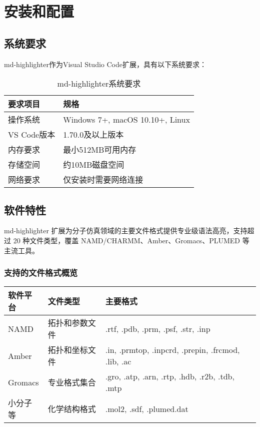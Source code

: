 
\section{安装和配置}

\subsection{系统要求}

md-highlighter作为Visual Studio Code扩展，具有以下系统要求：

\begin{table}[h]
\centering
\caption{md-highlighter系统要求}
\begin{tabular}{p{3cm}p{8cm}}
\toprule
\textbf{要求项目} & \textbf{规格} \\
\midrule
操作系统 & Windows 7+, macOS 10.10+, Linux \\
VS Code版本 & 1.70.0及以上版本 \\
内存要求 & 最小512MB可用内存 \\
存储空间 & 约10MB磁盘空间 \\
网络要求 & 仅安装时需要网络连接 \\
\bottomrule
\end{tabular}
\end{table}

\subsection{软件特性}

md-highlighter 扩展为分子仿真领域的主要文件格式提供专业级语法高亮，支持超过 20 种文件类型，覆盖 NAMD/CHARMM、Amber、Gromacs、PLUMED 等主流工具。

\subsubsection{支持的文件格式概览}
\begin{table}[h]
\centering
\caption{支持的文件格式概览}
\label{tab:file_format}
\begin{longtable}{p{2.5cm}p{3.5cm}p{8cm}}
\toprule
\textbf{软件平台} & \textbf{文件类型} & \textbf{主要格式} \\
\midrule
NAMD & 拓扑和参数文件 & .rtf, .pdb, .prm, .psf, .str, .inp \\
Amber & 拓扑和坐标文件 & .in, .prmtop, .inpcrd, .prepin, .frcmod, .lib, .ac \\
Gromacs & 专业格式集合 & .gro, .atp, .arn, .rtp, .hdb, .r2b, .tdb, .mtp \\
小分子等 & 化学结构格式 & .mol2, .sdf, .plumed.dat \\
\bottomrule
\end{longtable}
\end{table}

